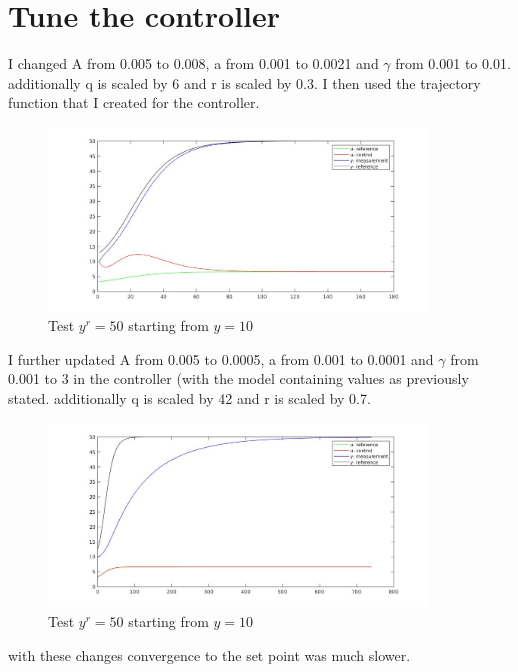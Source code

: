 \documentclass{article}
\begin{document}
\section{Tune the controller}

I changed A from 0.005 to 0.008, a from 0.001 to 0.0021 and $\gamma$ from 0.001 to 0.01. additionally q is scaled by 6 and r is scaled by 0.3.
I then used the trajectory function that I created for the controller.

\begin{figure}[H]
    \centering
    \includegraphics[width=0.9\textwidth]{mpc_modified_model.jpg}
    \caption{Test $y^r = 50$ starting from $y=10$}
    \label{fig:yr50}
\end{figure}

I further updated A from 0.005 to 0.0005, a from 0.001 to 0.0001 and $\gamma$ from 0.001 to 3 in the controller (with the model containing values as previously stated. additionally q is scaled by 42 and r is scaled by 0.7.

\begin{figure}[H]
    \centering
    \includegraphics[width=0.9\textwidth]{mpc_heavy_modified_model.jpg}
    \caption{Test $y^r = 50$ starting from $y=10$}
    \label{fig:yr50}
\end{figure}

with these changes convergence to the set point was much slower.
\end{document}
